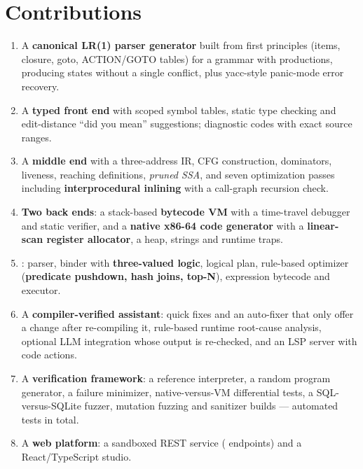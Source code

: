 \section{Contributions}
\begin{enumerate}[label=\textbf{C\arabic*.}]
  \item A \textbf{canonical LR(1) parser generator} built from first principles (items, closure, goto, ACTION/GOTO tables) for a grammar with \LRProductions{} productions, producing \LRStates{} states without a single conflict, plus yacc-style panic-mode error recovery.
  \item A \textbf{typed front end} with scoped symbol tables, static type checking and edit-distance ``did you mean'' suggestions; \NumDiagCodes{} diagnostic codes with exact source ranges.
  \item A \textbf{middle end} with a three-address IR, CFG construction, dominators, liveness, reaching definitions, \emph{pruned SSA}, and seven optimization passes including \textbf{interprocedural inlining} with a call-graph recursion check.
  \item \textbf{Two back ends}: a stack-based \textbf{bytecode VM} with a time-travel debugger and static verifier, and a \textbf{native x86-64 code generator} with a \textbf{linear-scan register allocator}, a heap, strings and runtime traps.
  \item \textbf{\novasql{}}: parser, binder with \textbf{three-valued logic}, logical plan, rule-based optimizer (\textbf{predicate pushdown, hash joins, top-N}), expression bytecode and executor.
  \item A \textbf{compiler-verified assistant}: quick fixes and an auto-fixer that only offer a change after re-compiling it, rule-based runtime root-cause analysis, optional LLM integration whose output is re-checked, and an LSP server with code actions.
  \item A \textbf{verification framework}: a reference interpreter, a random program generator, a failure minimizer, native-versus-VM differential tests, a SQL-versus-SQLite fuzzer, mutation fuzzing and sanitizer builds --- \TotalTests{} automated tests in total.
  \item A \textbf{web platform}: a sandboxed REST service (\NumEndpoints{} endpoints) and a React/TypeScript studio.
\end{enumerate}

